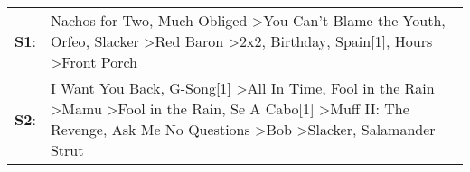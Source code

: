 \begin{supertabular}{p{0.03\textwidth}p{0.92\textwidth}}
 \textbf{S1}:  &                                                                                                Nachos for Two\textsuperscript{}, \enspace Much Obliged\textsuperscript{} \textgreater \enspace You Can't Blame the Youth\textsuperscript{}, \enspace Orfeo\textsuperscript{}, \enspace Slacker\textsuperscript{} \textgreater \enspace Red Baron\textsuperscript{} \textgreater \enspace 2x2\textsuperscript{}, \enspace Birthday\textsuperscript{}, \enspace Spain[1]\textsuperscript{}, \enspace Hours\textsuperscript{} \textgreater \enspace Front Porch\textsuperscript{}  \enspace  \\
 \textbf{S2}:  &  I Want You Back\textsuperscript{}, \enspace G-Song[1]\textsuperscript{} \textgreater \enspace All In Time\textsuperscript{}, \enspace Fool in the Rain\textsuperscript{} \textgreater \enspace Mamu\textsuperscript{} \textgreater \enspace Fool in the Rain\textsuperscript{}, \enspace Se A Cabo[1]\textsuperscript{} \textgreater \enspace Muff II: The Revenge\textsuperscript{}, \enspace Ask Me No Questions\textsuperscript{} \textgreater \enspace Bob\textsuperscript{} \textgreater \enspace Slacker\textsuperscript{}, \enspace Salamander Strut\textsuperscript{}  \enspace  \\
\end{supertabular}
